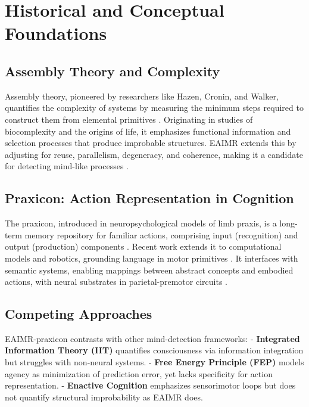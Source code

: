 \documentclass{article}
\begin{document}
\section{Historical and Conceptual Foundations}
\label{sec:foundations}

\subsection{Assembly Theory and Complexity}
Assembly theory, pioneered by researchers like Hazen, Cronin, and Walker, quantifies the complexity of systems by measuring the minimum steps required to construct them from elemental primitives \citep{hazen2007, cronin2016, walker2013}. Originating in studies of biocomplexity and the origins of life, it emphasizes functional information and selection processes that produce improbable structures. EAIMR extends this by adjusting for reuse, parallelism, degeneracy, and coherence, making it a candidate for detecting mind-like processes \citep{adami2012}.

\subsection{Praxicon: Action Representation in Cognition}
The praxicon, introduced in neuropsychological models of limb praxis, is a long-term memory repository for familiar actions, comprising input (recognition) and output (production) components \citep{peigneux2004, mantovani2010}. Recent work extends it to computational models and robotics, grounding language in motor primitives \citep{pastra2011, panunzi2018}. It interfaces with semantic systems, enabling mappings between abstract concepts and embodied actions, with neural substrates in parietal-premotor circuits \citep{vannuscorps2023}.

\subsection{Competing Approaches}
EAIMR-praxicon contrasts with other mind-detection frameworks:
- \textbf{Integrated Information Theory (IIT)} \citep{tononi2004} quantifies consciousness via information integration but struggles with non-neural systems.
- \textbf{Free Energy Principle (FEP)} \citep{friston2010} models agency as minimization of prediction error, yet lacks specificity for action representation.
- \textbf{Enactive Cognition} \citep{barandiaran2009} emphasizes sensorimotor loops but does not quantify structural improbability as EAIMR does.
\end{document}
